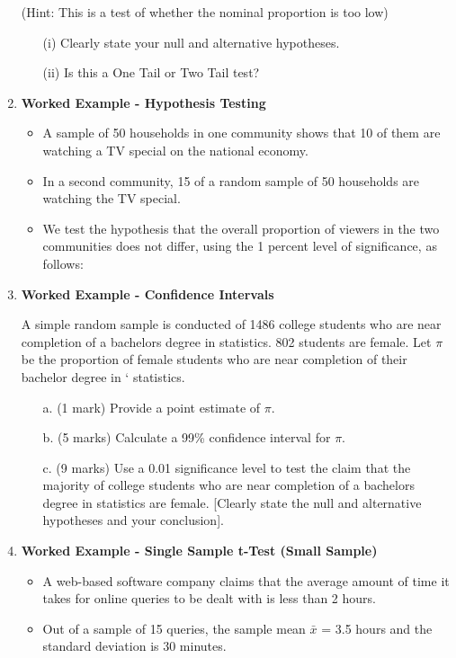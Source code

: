 \documentclass[]{report}
\begin{document}
\begin{enumerate}
	(Hint: This is a test of whether the nominal proportion is too low)
	\begin{itemize}
		\item[(i)] Clearly state your null and alternative hypotheses.
		\item[(ii)] Is this a One Tail or Two Tail test?
	\end{itemize}
	
	
	
	\item \textbf{Worked Example   - Hypothesis Testing}	
	
	\begin{itemize}
		\item A sample of 50 households in one community
		shows that 10 of them are watching a TV special on the national
		economy. 
		\item In a second community, 15 of a random sample of 50
		households are watching the TV special. 
		\item We test the hypothesis
		that the overall proportion of viewers in the two communities does
		not differ, using the 1 percent level of significance, as follows:
	\end{itemize}
	
	\item \textbf{Worked Example   - Confidence Intervals}	
	
	A simple random sample is conducted of 1486 college students who are near completion of a bachelors degree in statistics. 802 students are female. Let $\pi$ be the proportion of female students who are near completion of their bachelor degree in `
	statistics.
	\begin{itemize}
		\item[a.] (1 mark) Provide a point estimate of $\pi$.
		\item[b.] (5 marks) Calculate a 99\% confidence interval for $\pi$.
		\item[c.] (9 marks) Use a 0.01 significance level to test the claim that the majority of
		college students who are near completion of a bachelors degree in statistics are
		female. [Clearly state the null and alternative hypotheses and your conclusion].\end{itemize}
	
	
	\item \textbf{Worked Example  - Single Sample t-Test (Small Sample)  } \\ %
	\begin{itemize}
		\item 	A web-based software company claims that the average amount of time it takes for
		online queries to be dealt with is less than 2 hours. 
		\item Out of a sample of 15 queries, the
		sample mean $\bar{x}$ = 3.5 hours and the standard deviation is 30 minutes.
	\end{itemize}
	

\end{enumerate}
\end{document}
